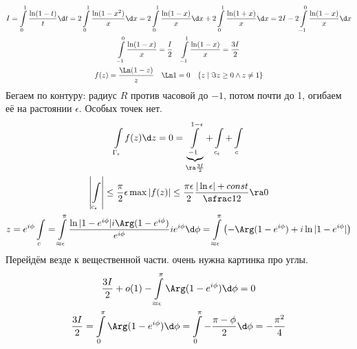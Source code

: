 \begin{exmp}
	\begin{gather*}
		I = \int\limits_0^1 \frac{\ln(1-t)}t \d t
		= 2 \int\limits_0^1 \frac{\ln(1-x^2)}x \d x
		= 2 \int\limits_0^1 \frac{\ln(1-x)}x \d x + 2\int\limits_0^1 \frac{\ln(1+x)}x \d x
		= 2I - 2\int\limits_{-1}^0 \frac{\ln(1-x)}x \d x \\
		\int\limits_{-1}^0 \frac{\ln(1-x)}x = \frac I2 \quad \int\limits_{-1}^1 \frac{\ln(1-x)}x = \frac{3I}2 \\
		f(z) = \frac{\Ln(1 - z)}z \quad \Ln 1 = 0 \quad \{z \mid \Im z \ge 0 \land z \ne 1\}
	\end{gather*}
	Бегаем по контуру: радиус $R$ против часовой до $-1$, потом почти до 1, огибаем её на растоянии $\epsilon$.
	Особых точек нет.
	\begin{gather*}
		\int\limits_{\Gamma_\epsilon} f(z) \d z = 0
		= \underbrace{\int\limits_{-1}^{1-\epsilon}}_{\ra \frac{3I}2} + \int\limits_{c_\epsilon} + \int\limits_c \\
		\left| \int\limits_{c_\epsilon} \right| \le \frac{\pi}2 \epsilon \max |f(z)| \le \frac{\pi\epsilon}2 \frac{|\ln \epsilon| + const}{\sfrac12} \ra 0 \\
		z = e^{i\phi}
		\int\limits_c = \int\limits_{\approx\epsilon}^\pi \frac{\ln |1-e^{i\phi}| i\Arg(1-e^{i\phi})}{e^{i\phi}} ie^{i\phi} \d \phi
		= \int\limits_{\approx\epsilon}^\pi \left(-\Arg(1-e^{i\phi}) + i\ln|1-e^{i\phi}|\right)
	\end{gather*}
	Перейдём везде к вещественной части. \TODO очень нужна картинка про углы.
	\begin{gather*}
		\frac{3I}2 + o(1) - \int\limits_{\approx\epsilon}^\pi \Arg (1 - e^{i\phi}) \d \phi = 0 \\
		\frac{3I}2 = \int\limits_{0}^\pi \Arg(1 - e^{i\phi}) \d \phi = \int\limits_0^\pi -\frac{\pi - \phi}2 \d \phi
		= -\frac{\pi^2}4
	\end{gather*}
\end{exmp}
